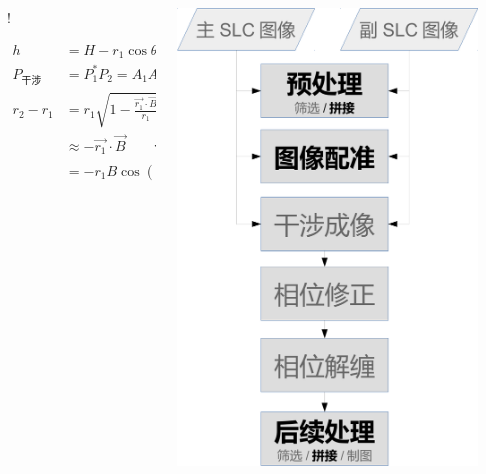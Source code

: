 \documentclass{beamer}
\begin{document}
\begin{frame}
\begin{columns}
\begin{column}{0.5\textwidth}
             {!} {
                \begin{minipage}{\linewidth}
                \begin{align*}
                    h &= H - r_1 \cos\theta \\
                    P_{\textrm{干涉}} &= P_1^* P_2 =  A_1 A_2 \exp(i \frac{4\pi}{\lambda}(r_2 - r_1)) \\
                    r_2 - r_1 &= r_1 \sqrt{1- \frac{\vec{r_1} \cdot \vec{B}}{r_1} + (\frac{B}{r_1})^2} \\
                              &\approx - \vec{r_1} \cdot \vec{B} \qquad \because B \ll |\vec{r}| \\
                              &= - r_1 B \cos(\frac{\pi}{2} - \theta + \alpha)
                \end{align*}
                \end{minipage}
            }
        \end{column}
        \begin{column}{0.5\textwidth}
            \includegraphics[width=0.9\textwidth]{figures/process.pdf}
        \end{column}
    \end{columns}
\end{frame}
\end{document}
